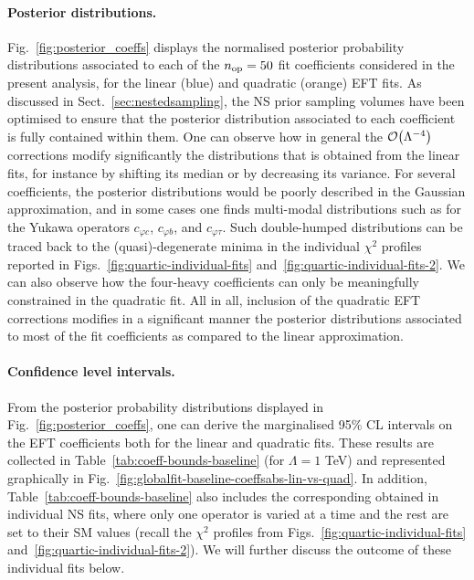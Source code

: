 \paragraph{Posterior distributions.}
%
Fig.~\ref{fig:posterior_coeffs} displays
the normalised posterior probability distributions associated
to each of the $n_{\rm op}=50$ fit coefficients considered in the present
analysis, for the linear (blue) and quadratic (orange) EFT fits.
%
As discussed in Sect.~\ref{sec:nestedsampling},
the NS prior sampling volumes have been optimised to ensure
that the posterior distribution associated to each coefficient
is fully contained within them.
%
One can observe how in general
the $\mathcal{O}\lp \Lambda^{-4}\rp$ corrections modify significantly
 the distributions that is obtained from the linear fits, for instance
 by shifting its median or by decreasing its variance.
 For several coefficients, the posterior distributions would be poorly
 described in the Gaussian approximation,
 and in some cases one finds multi-modal distributions
 such as for the Yukawa operators $c_{\varphi c}$, $c_{\varphi b}$, and
 $c_{\varphi \tau}$.
 Such double-humped distributions can be traced back to the (quasi)-degenerate
 minima in the individual
 $\chi^2$ profiles reported in
 Figs.~\ref{fig:quartic-individual-fits} and~\ref{fig:quartic-individual-fits-2}.
%
 We can also observe how the four-heavy coefficients can only be meaningfully
 constrained in the quadratic fit.
 All in all, inclusion of the quadratic EFT corrections modifies
 in a significant manner the posterior distributions associated
 to most of the fit coefficients as compared to the linear approximation.

\paragraph{Confidence level intervals.}
%
From the posterior probability distributions displayed in Fig.~\ref{fig:posterior_coeffs},
one can derive the marginalised 95\% CL intervals on the 
EFT coefficients both for the linear and quadratic fits.
%
These results are collected in Table~\ref{tab:coeff-bounds-baseline}
(for $\Lambda=1$ TeV)
and represented graphically in
Fig.~\ref{fig:globalfit-baseline-coeffsabs-lin-vs-quad}.
%
In addition,  Table~\ref{tab:coeff-bounds-baseline} also includes
the corresponding obtained in  individual NS fits, where only one
operator is varied at a time and the rest are set
to their SM values (recall the $\chi^2$ profiles from
Figs.~\ref{fig:quartic-individual-fits} and~\ref{fig:quartic-individual-fits-2}).
%
We will further discuss the outcome of these individual fits below.

